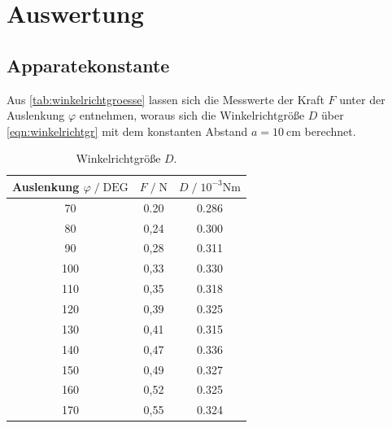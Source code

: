 \section{Auswertung}
\label{sec:Auswertung}



\subsection{Apparatekonstante}
\label{sec:Apparatekonstante}
Aus \autoref{tab:winkelrichtgroesse} lassen sich die Messwerte der Kraft $F$ unter der Auslenkung $\varphi$ entnehmen, woraus sich die
Winkelrichtgröße $D$ über \autoref{eqn:winkelrichtgr} mit dem konstanten Abstand $a=\SI{10}{\centi\meter}$ berechnet.


\begin{table}[H]
  \centering
  \caption{Winkelrichtgröße $D$.}
  \label{tab:winkelrichtgroesse}
  \begin{tabular}{c c c}
      \toprule
      Auslenkung $ \varphi \;/\; \text{DEG}$ & $F \;/\; \si{\newton}$ & $D \;/\; 10^{-3}\si{\newton\meter}$\\
      \midrule
      70 & 0.20 & 0.286 \\
      80 & 0,24 & 0.300 \\
      90 & 0,28 & 0.311 \\
      100 & 0,33 & 0.330 \\
      110 & 0,35 & 0.318 \\
      120 & 0,39 & 0.325 \\ 
      130 & 0,41 & 0.315 \\
      140 & 0,47 & 0.336 \\
      150 & 0,49 & 0.327 \\
      160 & 0,52 & 0.325 \\
      170 & 0,55 & 0.324 \\
      \bottomrule
  \end{tabular}
\end{table}

